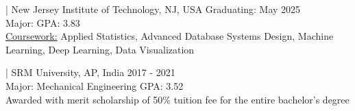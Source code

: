  | New Jersey Institute of Technology, NJ, USA \hfill Graduating: May 2025 \\
{Major:  \hfill GPA: 3.83} \\
{\underline{Coursework:} Applied Statistics, Advanced Database Systems Design, Machine Learning, Deep Learning, Data Visualization}


 | SRM University, AP, India \hfill 2017 - 2021 \\
{Major: Mechanical Engineering \hfill GPA: 3.52} \\
{Awarded with merit scholarship of 50\% tuition fee for the entire bachelor's degree}










